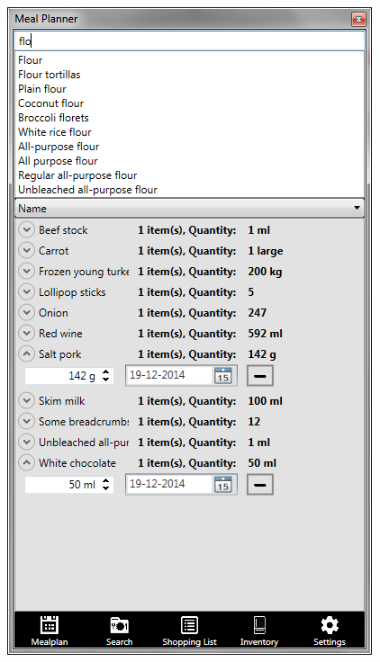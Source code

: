 \begin{figure}[H]
\begin{minipage}{.33\textwidth}
\end{minipage}%
\begin{minipage}{.33\textwidth}
  \centering
  \includegraphics[width=.9\linewidth]{Grafik/InventoryPage}
  \label{fig:InventoryPage}
\end{minipage}%
\begin{minipage}{.33\textwidth}
  \centering

\end{minipage}
\end{figure}
